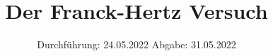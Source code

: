 

\subject{V601}
\title{Der Franck-Hertz Versuch}
\date{%
  Durchführung: 24.05.2022
  \hspace{3em}
  Abgabe: 31.05.2022
}



\maketitle
\thispagestyle{empty}
\tableofcontents
\newpage







\printbibliography{}


